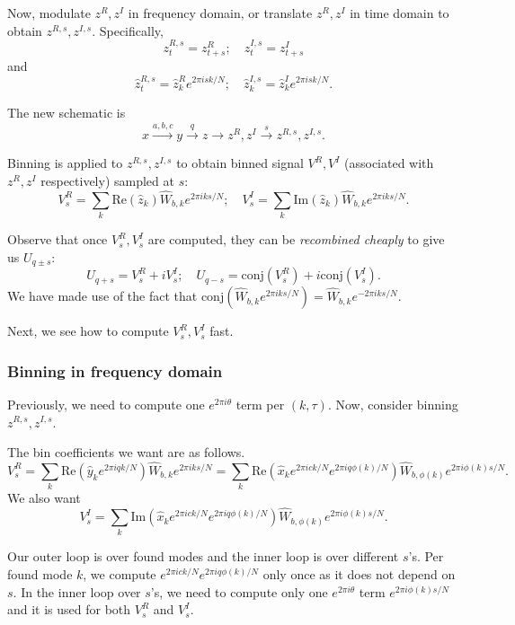 \documentclass[10pt]{article}
\begin{document}
Now, modulate $z^R, z^I$ in frequency domain, or translate $z^R,z^I$ in time domain to obtain $z^{R,s}, z^{I,s}$. Specifically,
$$z^{R,s}_{t}=z^R_{t+s}; \quad z^{I,s}_{t}=z^I_{t+s}$$
and
$$\hat{z}^{R,s}_{t}=\hat{z}^R_{k}e^{2\pi i s k/N}; \quad \hat{z}^{I,s}_{k}=\hat{z}^I_{k} e^{2\pi i sk/N}.$$

The new schematic is
$$x \xrightarrow{a,b,c}{y} \xrightarrow{q} z \rightarrow z^R, z^I \xrightarrow{s} z^{R,s}, z^{I,s}.$$

Binning is applied to $z^{R,s}, z^{I,s}$ to obtain binned signal $V^R, V^I$ (associated with $z^R, z^I$ respectively) sampled at $s$:
$$V^{R}_s = \sum_k \text{Re}(\hat{z}_k) \hat{W}_{b,k} e^{2\pi i ks/N};\quad V^{I}_s = \sum_k \text{Im}(\hat{z}_k) \hat{W}_{b,k} e^{2\pi i ks/N}.$$

Observe that once $V^R_s,V^I_s$ are computed, they can be \emph{recombined cheaply} to give us $U_{q\pm s}$:
$$U_{q+s} = V^{R}_s + i V^I_s; \quad U_{q-s} = \text{conj}(V^{R}_s) + i \text{conj}(V^{I}_s).$$
We have made use of the fact that $\text{conj}(\hat{W}_{b,k} e^{2\pi i ks/N}) = \hat{W}_{b,k} e^{-2\pi i ks/N}$.

Next, we see how to compute $V^R_s, V^I_{s}$ fast.

\subsubsection{Binning in frequency domain}

Previously, we need to compute one $e^{2\pi i \theta}$ term per $(k, \tau)$. Now, consider binning $z^{R,s},z^{I,s}$.

The bin coefficients we want are as follows.
$$V^R_s = \sum_k \text{Re}(\hat{y}_k e^{2\pi i qk/N}) \hat{W}_{b,k} e^{2\pi i k s/N} = \sum_k \text{Re}(\hat{x}_k e^{2\pi i ck/N} e^{2\pi i q \phi(k)/N})\hat{W}_{b,\phi(k)} e^{2\pi i \phi(k) s/N}.$$
We also want
$$V^I_s = \sum_k \text{Im}(\hat{x}_k e^{2\pi i ck/N} e^{2\pi i q \phi(k)/N})\hat{W}_{b,\phi(k)} e^{2\pi i \phi(k) s/N}.$$

Our outer loop is over found modes and the inner loop is over different $s$'s. Per found mode $k$, we compute $e^{2\pi i ck/N} e^{2\pi i q \phi(k)/N}$ only once as it does not depend on $s$. In the inner loop over $s$'s, we need to compute only one $e^{2\pi i \theta}$ term $e^{2\pi i \phi(k)s/N}$ and it is used for both $V^R_s$ and $V^I_s$.
\end{document}
